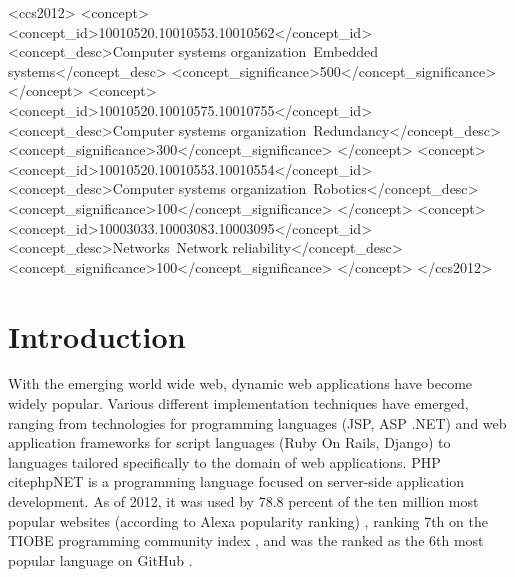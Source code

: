 \documentclass[sigconf]{acmart}
\begin{document}
%
%
\begin{CCSXML}
<ccs2012>
 <concept>
  <concept_id>10010520.10010553.10010562</concept_id>
  <concept_desc>Computer systems organization~Embedded systems</concept_desc>
  <concept_significance>500</concept_significance>
 </concept>
 <concept>
  <concept_id>10010520.10010575.10010755</concept_id>
  <concept_desc>Computer systems organization~Redundancy</concept_desc>
  <concept_significance>300</concept_significance>
 </concept>
 <concept>
  <concept_id>10010520.10010553.10010554</concept_id>
  <concept_desc>Computer systems organization~Robotics</concept_desc>
  <concept_significance>100</concept_significance>
 </concept>
 <concept>
  <concept_id>10003033.10003083.10003095</concept_id>
  <concept_desc>Networks~Network reliability</concept_desc>
  <concept_significance>100</concept_significance>
 </concept>
</ccs2012>  
\end{CCSXML}




\maketitle

\section{Introduction}
With the emerging world wide web, dynamic web applications have become
widely popular. Various different implementation techniques have emerged,
ranging from technologies for programming languages (JSP, ASP .NET) and web
application frameworks for  script languages (Ruby On Rails, Django) to
languages tailored specifically to the domain of web applications. PHP
cite{phpNET} is a programming language focused on server-side application
development. As of 2012, it was used by 78.8 percent of the ten million most popular websites (according
to Alexa popularity ranking) \cite{alexaPHP}, ranking 7th on the TIOBE
programming community index \cite{tiobePHP}, and was the ranked as the 6th
most popular language on GitHub \cite{githubPHP}.
\end{document}
